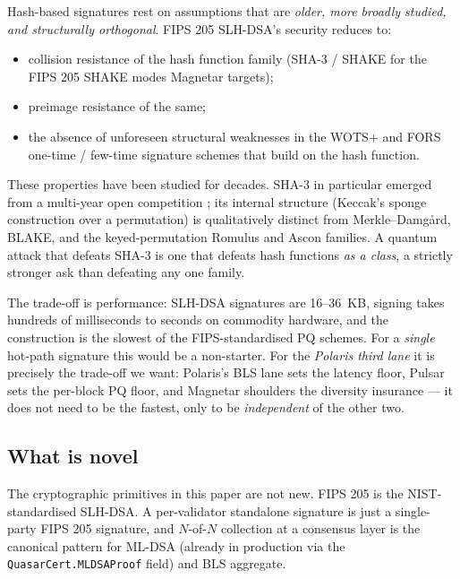 Hash-based signatures rest on assumptions that are \emph{older, more
broadly studied, and structurally orthogonal}. FIPS 205 SLH-DSA's
security reduces to:
\begin{itemize}[leftmargin=2em,nosep]
  \item collision resistance of the hash function family
        (SHA-3 / SHAKE for the FIPS 205 SHAKE modes Magnetar targets);
  \item preimage resistance of the same;
  \item the absence of unforeseen structural weaknesses in the WOTS+
        and FORS one-time / few-time signature schemes that build on
        the hash function.
\end{itemize}
These properties have been studied for decades. SHA-3 in particular
emerged from a multi-year open competition \cite{keccak-keccak}; its
internal structure (Keccak's sponge construction over a permutation)
is qualitatively distinct from Merkle--Damg{\aa}rd, BLAKE, and the
keyed-permutation Romulus and Ascon families. A quantum attack that
defeats SHA-3 is one that defeats hash functions \emph{as a class}, a
strictly stronger ask than defeating any one family.

The trade-off is performance: SLH-DSA signatures are 16--36~KB, signing
takes hundreds of milliseconds to seconds on commodity hardware, and
the construction is the slowest of the FIPS-standardised PQ schemes.
For a \emph{single} hot-path signature this would be a non-starter.
For the \emph{Polaris third lane} it is precisely the trade-off we
want: Polaris's BLS lane sets the latency floor, Pulsar sets the
per-block PQ floor, and Magnetar shoulders the diversity insurance ---
it does not need to be the fastest, only to be \emph{independent} of
the other two.

\subsection{What is novel}
\label{sec:intro:novel}

The cryptographic primitives in this paper are not new. FIPS 205
\cite{fips205} is the NIST-standardised SLH-DSA. A per-validator
standalone signature is just a single-party FIPS 205 signature, and
$N$-of-$N$ collection at a consensus layer is the canonical pattern
for ML-DSA (already in production via the \texttt{QuasarCert.MLDSAProof}
field) and BLS aggregate.

